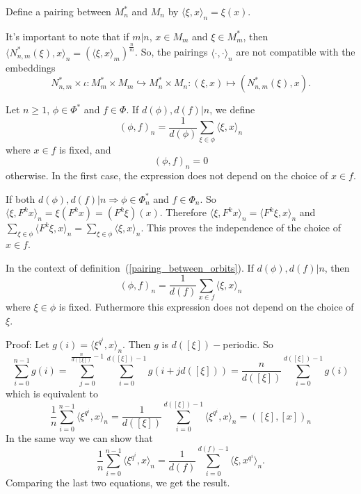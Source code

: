 \begin{dang}
    \begin{definition}\cite{macdonald1998symmetric}
        Define a pairing between $M_n^*$ and $M_n$ by $\langle \xi,x\rangle_n=\xi(x)$.
    \end{definition}
\end{dang}
It's important to note that if $m|n$, $x\in M_m$ and $\xi\in M_m^*$, then $\langle N_{n,m}^*(\xi),x\rangle_n=(\langle \xi,x\rangle_m)^{\frac{n}{m}}$. So, the pairings $\langle\cdot,\cdot\rangle_n$ are not compatible with the embeddings
\begin{equation}
    N_{n,m}^*\times \iota: M_m^*\times M_m \hookrightarrow M_n^*\times M_n:(\xi,x)\mapsto (N_{n,m}^*(\xi),x).
\end{equation}
\begin{dang}
    \begin{definition}\cite{jing2024characters}\label{pairing_between_orbits}
        Let $n\geq1$, $\phi\in\Phi^*$ and $f\in\Phi$. If $d(\phi),d(f)|n$, we define
        \[
        (\phi,f)_n = \frac{1}{d(\phi)}\sum_{\xi\in\phi}\langle \xi, x\rangle_n
        \]
        where $x\in f$ is fixed, and
        \[
         (\phi,f)_n=0
        \]
        otherwise. In the first case, the expression does not depend on the choice of $x\in f$.
    \end{definition}
\end{dang}
 If both $d(\phi),d(f)|n\Rightarrow \phi\in\Phi_n^*$ and $f\in\Phi_n$. So $\langle \xi,F^kx\rangle_n=\xi(F^kx)=(F^k\xi)(x)$. Therefore $\langle \xi, F^kx\rangle_n=\langle F^k\xi, x\rangle_n$ and $\sum_{\xi\in\phi}\langle F^k\xi,x\rangle_n=\sum_{\xi\in\phi}\langle \xi,x\rangle_n$. This proves the independence of the choice of $x\in f$.
\begin{dang}
    \begin{lemma}\cite{jing2024characters}
    In the context of definition~(\ref{pairing_between_orbits}). If $d(\phi),d(f)|n$, then 
    \[
    (\phi,f)_n = \frac{1}{d(f)}\sum_{x\in f}\langle \xi, x\rangle_n
    \]
    where $\xi\in\phi$ is fixed. Futhermore this expression does not depend on the choice of $\xi$.
    \end{lemma}
\end{dang}
Proof: Let $g(i)=\langle\xi^{q^i},x\rangle_n$. Then $g$ is $d([\xi])-$periodic. So
\begin{equation}\label{Equation: periodic sum}
    \sum_{i=0}^{n-1}g(i) = \sum_{j=0}^{\frac{n}{d([\xi])}-1}\sum_{i=0}^{d([\xi])-1}g(i+jd([\xi]))=\frac{n}{d([\xi])}\sum_{i=0}^{d([\xi])-1}g(i)
\end{equation}
which is equivalent to 
\begin{equation}
    \frac{1}{n} \sum_{i=0}^{n-1}\langle\xi^{q^i},x\rangle_n=\frac{1}{d([\xi])}\sum_{i=0}^{d([\xi])-1}\langle\xi^{q^i},x\rangle_n=([\xi],[x])_n
\end{equation}
In the same way we can show that
\begin{equation}
     \frac{1}{n} \sum_{i=0}^{n-1}\langle\xi^{q^i},x\rangle_n = \frac{1}{d(f)}\sum_{i=0}^{d(f)-1}\langle\xi,x^{q^{i}}\rangle_n.
\end{equation}
Comparing the last two equations, we get the result.

